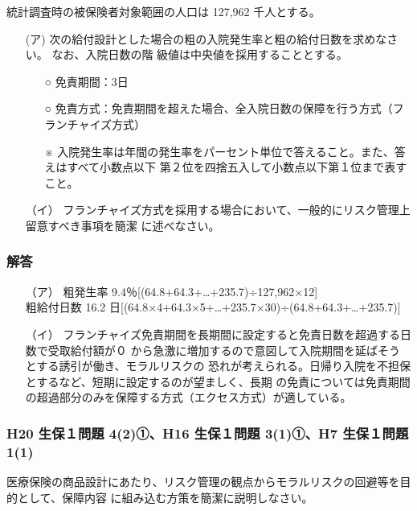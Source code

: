 \documentclass[report,gutter=10mm,fore-edge=10mm,uplatex,dvipdfmx]{jlreq}
\begin{document}
統計調査時の被保険者対象範囲の人口は 127,962 千人とする。
\begin{itemize}
 \item [ (ア)]
 次の給付設計とした場合の粗の入院発生率と粗の給付日数を求めなさい。 なお、入院日数の階
 級値は中央値を採用することとする。
\begin{itemize}
 \item [○] 免責期間：3日
 \item [○] 免責方式：免責期間を超えた場合、全入院日数の保障を行う方式（フランチャイズ方式）
 \item [※]  入院発生率は年間の発生率をパーセント単位で答えること。また、答えはすべて小数点以下
 第２位を四捨五入して小数点以下第１位まで表すこと。
\end{itemize} 
 \item [（イ）]
 フランチャイズ方式を採用する場合において、一般的にリスク管理上留意すべき事項を簡潔
 に述べなさい。
\end{itemize}
\subsubsection{解答}
\begin{itemize}
 \item [（ア）]  粗発生率 9.4％[(64.8+64.3+…+235.7)÷127,962×12]\\
       粗給付日数 16.2 日[(64.8×4+64.3×5+…+235.7×30)÷(64.8+64.3+…+235.7)]
 \item [（イ）] フランチャイズ免責期間を長期間に設定すると免責日数を超過する日数で受取給付額が０
  から急激に増加するので意図して入院期間を延ばそうとする誘引が働き、モラルリスクの
 恐れが考えられる。日帰り入院を不担保とするなど、短期に設定するのが望ましく、長期
 の免責については免責期間の超過部分のみを保障する方式（エクセス方式）が適している。
\end{itemize}

\subsubsection{H20 生保１問題 4(2)①、H16 生保１問題 3(1)①、H7 生保１問題 1(1)} 
 医療保険の商品設計にあたり、リスク管理の観点からモラルリスクの回避等を目的として、保障内容
 に組み込む方策を簡潔に説明しなさい。
\end{document}
